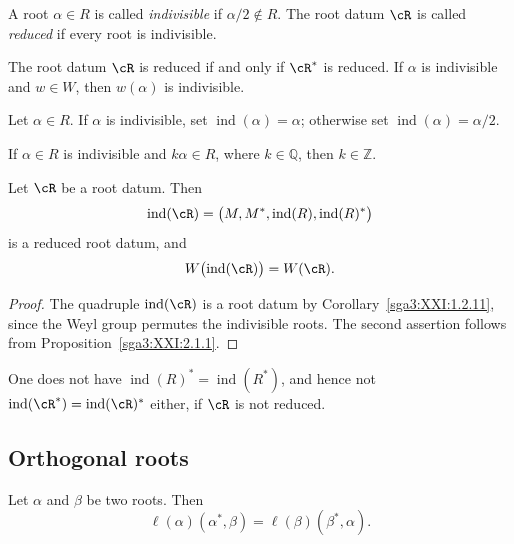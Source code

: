 \begin{definition}\label{sga3:XXI:2.1.3}
A root \(\alpha\in R\) is called \emph{indivisible} if
\(\alpha/2\notin R\). The root datum \(\cR\) is called
\emph{reduced} if every root is indivisible.
\end{definition}

The root datum \(\cR\) is reduced if and only if \(\cR^\ast\) is
reduced. If \(\alpha\) is indivisible and \(w\in W\), then
\(w(\alpha)\) is indivisible.

\begin{definition}\label{sga3:XXI:2.1.4}
Let \(\alpha\in R\). If \(\alpha\) is indivisible, set
\(\operatorname{ind}(\alpha)=\alpha\); otherwise set
\(\operatorname{ind}(\alpha)=\alpha/2\).
\end{definition}

\begin{corollary}\label{sga3:XXI:2.1.5}
If \(\alpha\in R\) is indivisible and \(k\alpha\in R\), where
\(k\in\mathbb Q\), then \(k\in\mathbb Z\).
\end{corollary}

\begin{proposition}\label{sga3:XXI:2.1.6}
Let \(\cR\) be a root datum. Then
\[
 \operatorname{ind}(\cR)
 =\bigl(M,M^\ast,\operatorname{ind}(R),
         \operatorname{ind}(R)^\ast\bigr)
\]
is a reduced root datum, and
\[
 W\bigl(\operatorname{ind}(\cR)\bigr)=W(\cR).
\]
\end{proposition}

\begin{proof}
The quadruple \(\operatorname{ind}(\cR)\) is a root datum by
Corollary~\ref{sga3:XXI:1.2.11}, since the Weyl group permutes the
indivisible roots. The second assertion follows from
Proposition~\ref{sga3:XXI:2.1.1}.
\end{proof}

\begin{remark}\label{sga3:XXI:2.1.7}
One does not have \(\operatorname{ind}(R)^\ast=\operatorname{ind}(R^\ast)\), and
hence not \(\operatorname{ind}(\cR^\ast)=\operatorname{ind}(\cR)^\ast\) either, if
\(\cR\) is not reduced.
\end{remark}

\subsection{Orthogonal roots}

\begin{lemma}\label{sga3:XXI:2.2.1}
Let \(\alpha\) and \(\beta\) be two roots. Then
\begin{equation}
 \ell(\alpha)(\alpha^\ast,\beta)
 =\ell(\beta)(\beta^\ast,\alpha).
 \tag{11}\label{sga3:XXI:eq:11}
\end{equation}
\end{lemma}

